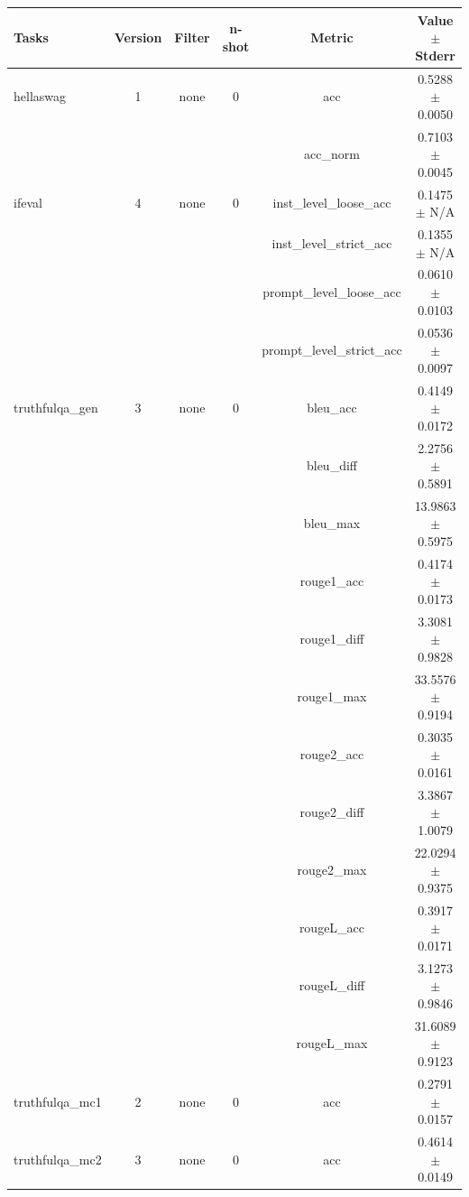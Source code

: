 \documentclass{ifacconf}
\begin{document}
\begin{strip}
\begin{minipage}{\textwidth}
    \begin{table}[H]
    \centering
    \begin{tabular}{|l|c|c|c|c|c|}
    \hline
    \textbf{Tasks} & \textbf{Version} & \textbf{Filter} & \textbf{n-shot} & \textbf{Metric} & \textbf{Value} $\pm$ \textbf{Stderr} \\ \hline
    hellaswag & 1 & none & 0 & acc & 0.5288 $\pm$ 0.0050 \\ \hline
    & & & & acc\_norm & 0.7103 $\pm$ 0.0045 \\ \hline
    ifeval & 4 & none & 0 & inst\_level\_loose\_acc & 0.1475 $\pm$ N/A \\ \hline
    & & & & inst\_level\_strict\_acc & 0.1355 $\pm$ N/A \\ \hline
    & & & & prompt\_level\_loose\_acc & 0.0610 $\pm$ 0.0103 \\ \hline
    & & & & prompt\_level\_strict\_acc & 0.0536 $\pm$ 0.0097 \\ \hline
    truthfulqa\_gen & 3 & none & 0 & bleu\_acc & 0.4149 $\pm$ 0.0172 \\ \hline
    & & & & bleu\_diff & 2.2756 $\pm$ 0.5891 \\ \hline
    & & & & bleu\_max & 13.9863 $\pm$ 0.5975 \\ \hline
    & & & & rouge1\_acc & 0.4174 $\pm$ 0.0173 \\ \hline
    & & & & rouge1\_diff & 3.3081 $\pm$ 0.9828 \\ \hline
    & & & & rouge1\_max & 33.5576 $\pm$ 0.9194 \\ \hline
    & & & & rouge2\_acc & 0.3035 $\pm$ 0.0161 \\ \hline
    & & & & rouge2\_diff & 3.3867 $\pm$ 1.0079 \\ \hline
    & & & & rouge2\_max & 22.0294 $\pm$ 0.9375 \\ \hline
    & & & & rougeL\_acc & 0.3917 $\pm$ 0.0171 \\ \hline
    & & & & rougeL\_diff & 3.1273 $\pm$ 0.9846 \\ \hline
    & & & & rougeL\_max & 31.6089 $\pm$ 0.9123 \\ \hline
    truthfulqa\_mc1 & 2 & none & 0 & acc & 0.2791 $\pm$ 0.0157 \\ \hline
    truthfulqa\_mc2 & 3 & none & 0 & acc & 0.4614 $\pm$ 0.0149 \\ \hline
    \end{tabular}
    \label{tab:llama31_pruned}
    \end{table}


\end{minipage}
\end{strip}
\end{document}
